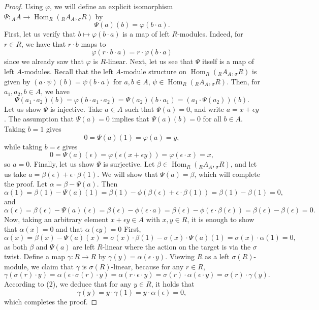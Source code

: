 \documentclass{amsart}
\theoremstyle{definition}
\newcommand{\opn}{\operatorname}
\numberwithin{equation}{section}
\begin{document}
\begin{proof}
Using $\varphi$, we will define an explicit isomorphism $\Psi: {}_A A \to \opn{Hom}_R\left({}_R A_A, {}_{\sigma} R\right)$ by
\[
\Psi(a)(b) = \varphi(b\cdot a).
\]
First, let us verify that $b \mapsto \varphi(b \cdot a)$ is a map of left $R$-modules. Indeed, for $r \in R$,
we have that $r\cdot b$ maps to
\[
\varphi(r\cdot b \cdot a) = r\cdot \varphi(b\cdot a)
\]
since we already saw that $\varphi$ is $R$-linear.
Next, let us see that $\Psi$ itself is a map of left $A$-modules.
Recall that the left $A$-module structure on 
$\opn{Hom}_R\left({}_R A_A, {}_{\sigma} R\right)$ is given by
$(a\cdot \psi) (b) = \psi(b \cdot a)$ for $a, b \in A$, $\psi \in \opn{Hom}_R\left({}_R A_A, {}_{\sigma} R\right)$.
Then, for $a_1, a_2, b\in A$, 
we have
\[
\Psi(a_1 \cdot a_2)(b) = \varphi(b \cdot a_1 \cdot a_2) = 
\Psi(a_2)(b\cdot a_1) = (a_1 \cdot \Psi(a_2))(b).
\]
Let us show $\Psi$ is injective.
Take $a \in A$ such that $\Psi(a) = 0$,
and write $a = x+\epsilon y$.
The assumption that $\Psi(a) = 0$ implies that $\Psi(a)(b) = 0$ for all $b \in A$.
Taking $b=1$ gives
\[
0 = \Psi(a)(1) = \varphi(a) = y,
\]
while taking $b = \epsilon$ gives
\[
0 = \Psi(a)(\epsilon) = \varphi(\epsilon (x+\epsilon y)) = \varphi(\epsilon \cdot x) = x,
\]
so $a = 0$.
Finally, let us show $\Psi$ is surjective.
Let $\beta \in \opn{Hom}_R\left({}_R A_A, {}_{\sigma} R\right)$,
and let us take $a = \beta(\epsilon) + \epsilon \cdot \beta(1)$.
We will show that $\Psi(a) = \beta$, which will complete the proof.
Let $\alpha = \beta - \Psi(a)$.
Then 
\[
\alpha(1) = \beta(1) - \Psi(a)(1) = \beta(1) - \phi(\beta(\epsilon) + \epsilon \cdot \beta(1)) = \beta(1) - \beta(1) = 0,
\]
and 
\[
\alpha(\epsilon) =  \beta(\epsilon) - \Psi(a)(\epsilon) = 
\beta(\epsilon) - \phi(\epsilon \cdot a) = 
\beta(\epsilon) - \phi(\epsilon \cdot \beta(\epsilon)) = \beta(\epsilon) - \beta(\epsilon) = 0.
\]
Now, taking an arbitrary element $x+\epsilon y \in A$ with $x,y \in R$,
it is enough to show that $\alpha(x) = 0$ and that $\alpha(\epsilon y) =0$
First,
\[
\alpha(x) = \beta(x) - \Psi(a)(x) = \sigma(x)\cdot \beta(1) - \sigma(x)\cdot \Psi(a)(1) = \sigma(x)\cdot \alpha(1) = 0,
\]
as both $\beta$ and $\Psi(a)$ are left $R$-linear where the action on the target is via the $\sigma$ twist.
Define a map $\gamma:R \to R$ by $\gamma(y) = \alpha(\epsilon \cdot y)$. Viewing $R$ as a left $\sigma(R)$-module,
we claim that $\gamma$ is $\sigma(R)$-linear,
because for any $r \in R$,
\[
\gamma(\sigma(r) \cdot y) = \alpha(\epsilon \cdot \sigma(r) \cdot y) = 
\alpha(r\cdot \epsilon \cdot y) = \sigma(r) \cdot \alpha(\epsilon \cdot y) = \sigma(r) \cdot \gamma(y).
\]
According to (2),
we deduce that for any $y \in R$, 
it holds that
\[
\gamma(y) = y \cdot \gamma(1) = y\cdot \alpha(\epsilon) = 0,
\]
which completes the proof.
\end{proof}
\end{document}
